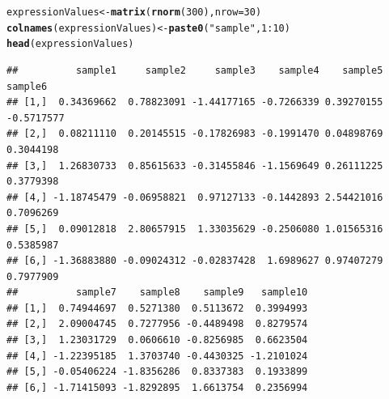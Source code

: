 \documentclass[a4paper]{article}\usepackage[]{graphicx}\usepackage[]{color}
\makeatletter
\newcommand{\hlnum}[1]{\textcolor[rgb]{0.686,0.059,0.569}{#1}}%
\newcommand{\hlstr}[1]{\textcolor[rgb]{0.192,0.494,0.8}{#1}}%
\newcommand{\hlopt}[1]{\textcolor[rgb]{0,0,0}{#1}}%
\newcommand{\hlstd}[1]{\textcolor[rgb]{0.345,0.345,0.345}{#1}}%
\newcommand{\hlkwb}[1]{\textcolor[rgb]{0.69,0.353,0.396}{#1}}%
\newcommand{\hlkwc}[1]{\textcolor[rgb]{0.333,0.667,0.333}{#1}}%
\newcommand{\hlkwd}[1]{\textcolor[rgb]{0.737,0.353,0.396}{\textbf{#1}}}%
\newenvironment{kframe}{%
 \def\at@end@of@kframe{}%
 \ifinner\ifhmode%
  \def\at@end@of@kframe{\end{minipage}}%
  \begin{minipage}{\columnwidth}%
 \fi\fi%
 \def\FrameCommand##1{\hskip\@totalleftmargin \hskip-\fboxsep
 \colorbox{shadecolor}{##1}\hskip-\fboxsep
     \hskip-\linewidth \hskip-\@totalleftmargin \hskip\columnwidth}%
 \MakeFramed {\advance\hsize-\width
   \@totalleftmargin\z@ \linewidth\hsize
   \@setminipage}}%
 {\par\unskip\endMakeFramed%
 \at@end@of@kframe}
\newenvironment{knitrout}{}{} %
\makeatother
\begin{document}
\begin{knitrout}
\color{fgcolor}\begin{kframe}
\begin{alltt}
\hlstd{expressionValues} \hlkwb{<-} \hlkwd{matrix} \hlstd{(}\hlkwd{rnorm} \hlstd{(}\hlnum{300}\hlstd{),} \hlkwc{nrow}\hlstd{=}\hlnum{30}\hlstd{)}
\hlkwd{colnames}\hlstd{(expressionValues)} \hlkwb{<-} \hlkwd{paste0}\hlstd{(}\hlstr{"sample"}\hlstd{,}\hlnum{1}\hlopt{:}\hlnum{10}\hlstd{)}
\hlkwd{head}\hlstd{(expressionValues)}
\end{alltt}
\begin{verbatim}
##          sample1     sample2     sample3    sample4    sample5    sample6
## [1,]  0.34369662  0.78823091 -1.44177165 -0.7266339 0.39270155 -0.5717577
## [2,]  0.08211110  0.20145515 -0.17826983 -0.1991470 0.04898769  0.3044198
## [3,]  1.26830733  0.85615633 -0.31455846 -1.1569649 0.26111225  0.3779398
## [4,] -1.18745479 -0.06958821  0.97127133 -0.1442893 2.54421016  0.7096269
## [5,]  0.09012818  2.80657915  1.33035629 -0.2506080 1.01565316  0.5385987
## [6,] -1.36883880 -0.09024312 -0.02837428  1.6989627 0.97407279  0.7977909
##          sample7    sample8    sample9   sample10
## [1,]  0.74944697  0.5271380  0.5113672  0.3994993
## [2,]  2.09004745  0.7277956 -0.4489498  0.8279574
## [3,]  1.23031729  0.0606610 -0.8256985  0.6623504
## [4,] -1.22395185  1.3703740 -0.4430325 -1.2101024
## [5,] -0.05406224 -1.8356286  0.8337383  0.1933899
## [6,] -1.71415093 -1.8292895  1.6613754  0.2356994
\end{verbatim}
\end{kframe}
\end{knitrout}
\end{document}
